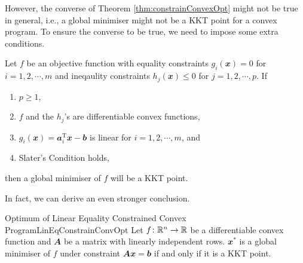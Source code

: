 \documentclass[math, code]{amznotes}
\theoremstyle{remark}
\begin{document}
However, the converse of Theorem \ref{thm:constrainConvexOpt} might not be true in general, i.e., a global minimiser might not be a KKT point for a convex program. To ensure the converse to be true, we need to impose some extra conditions.
\begin{probox}{}{}
    Let $f$ be an objective function with equality constraints $g_i(\mathbfit{x}) = 0$ for $i = 1, 2, \cdots, m$ and ineqaulity constraints $h_j(\mathbfit{x}) \leq 0$ for $j = 1, 2, \cdots, p$. If 
    \begin{enumerate}
        \item $p \geq 1$,
        \item $f$ and the $h_j$'s are differentiable convex functions,
        \item $g_i(\mathbfit{x}) = \mathbfit{a}_i^{\mathrm{T}}\mathbfit{x} - \mathbfit{b}$ is linear for $i = 1, 2, \cdots, m$, and
        \item Slater's Condition holds,
    \end{enumerate} 
    then a global minimiser of $f$ will be a KKT point.
\end{probox}
In fact, we can derive an even stronger conclusion.
\begin{thmbox}{Optimum of Linear Equality Constrained Convex Program}{LinEqConstrainConvOpt}
    Let $f \colon \mathbb{R}^n \to \mathbb{R}$ be a differentiable convex function and $\mathbfit{A}$ be a matrix with linearly independent rows. $\mathbfit{x}^*$ is a global minimiser of $f$ under constraint $\mathbfit{Ax = b}$ if and only if it is a KKT point.
\end{thmbox}
\end{document}
